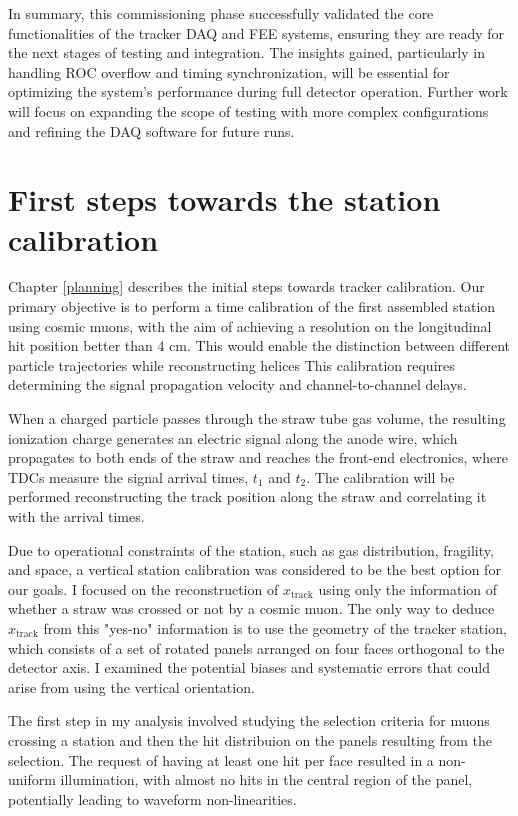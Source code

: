 In summary, this commissioning phase successfully validated 
the core functionalities 
of the tracker DAQ and FEE systems, ensuring they are ready 
for the next stages of 
testing and integration. The insights gained, particularly 
in handling ROC overflow 
and timing synchronization, will be essential for optimizing 
the system's performance 
during full detector operation. Further work will focus on 
expanding the scope of 
testing with more complex configurations and refining the 
DAQ software for future runs.


\section{First steps towards the station calibration}
Chapter \ref{planning} describes the initial steps towards 
tracker calibration. Our primary objective is to perform a time calibration of 
the first assembled station using cosmic muons, with the aim of achieving 
a resolution on the longitudinal hit position better than 4 cm. 
This would enable the distinction 
between different particle trajectories while reconstructing helices
This calibration requires determining the signal propagation velocity and 
channel-to-channel delays. 

When a charged particle passes through the straw tube gas volume, the 
resulting ionization charge generates an electric signal along the anode wire, 
which propagates to both ends of the straw and reaches the front-end 
electronics, where TDCs measure the signal arrival times, $t_1$ and $t_2$. 
The calibration will be performed reconstructing the track position 
along the straw and correlating it with the arrival times. 

Due to operational constraints of the station, such as gas distribution, fragility, 
and space, a vertical station calibration was considered to be the best option for our goals.
I focused on the reconstruction of $x_{\text{track}}$ using only the 
information of whether a straw was crossed or not by a cosmic muon. The only 
way to deduce $x_{\text{track}}$ from this "yes-no" information is to use the geometry of the tracker station, 
which consists of a set of rotated panels arranged on four faces orthogonal 
to the detector axis. I examined the potential 
biases and systematic errors that could arise from using the vertical orientation. 

The first step in my analysis involved studying the selection criteria for 
muons crossing a station and then the hit distribuion on the panels 
resulting from the selection. 
The request of having at least one hit per face resulted in 
a non-uniform illumination, with almost no hits 
in the central region of the panel, potentially leading to 
waveform non-linearities. 

